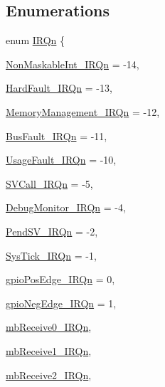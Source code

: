 \subsection*{Enumerations}
\begin{DoxyCompactItemize}
\item 
enum \hyperlink{a00468_a666eb0caeb12ec0e281415592ae89083}{IRQn} \{ \par
\hyperlink{a00468_a666eb0caeb12ec0e281415592ae89083ade177d9c70c89e084093024b932a4e30}{NonMaskableInt\_\-IRQn} =  -\/14, 
\par
\hyperlink{a00468_a666eb0caeb12ec0e281415592ae89083ab1a222a34a32f0ef5ac65e714efc1f85}{HardFault\_\-IRQn} =  -\/13, 
\par
\hyperlink{a00468_a666eb0caeb12ec0e281415592ae89083a33ff1cf7098de65d61b6354fee6cd5aa}{MemoryManagement\_\-IRQn} =  -\/12, 
\par
\hyperlink{a00468_a666eb0caeb12ec0e281415592ae89083a8693500eff174f16119e96234fee73af}{BusFault\_\-IRQn} =  -\/11, 
\par
\hyperlink{a00468_a666eb0caeb12ec0e281415592ae89083a6895237c9443601ac832efa635dd8bbf}{UsageFault\_\-IRQn} =  -\/10, 
\par
\hyperlink{a00468_a666eb0caeb12ec0e281415592ae89083a4ce820b3cc6cf3a796b41aadc0cf1237}{SVCall\_\-IRQn} =  -\/5, 
\par
\hyperlink{a00468_a666eb0caeb12ec0e281415592ae89083a8e033fcef7aed98a31c60a7de206722c}{DebugMonitor\_\-IRQn} =  -\/4, 
\par
\hyperlink{a00468_a666eb0caeb12ec0e281415592ae89083a03c3cc89984928816d81793fc7bce4a2}{PendSV\_\-IRQn} =  -\/2, 
\par
\hyperlink{a00468_a666eb0caeb12ec0e281415592ae89083a6dbff8f8543325f3474cbae2446776e7}{SysTick\_\-IRQn} =  -\/1, 
\par
\hyperlink{a00468_a666eb0caeb12ec0e281415592ae89083ab98b2a9cd2f0a724c5eb4016c6a1309e}{gpioPosEdge\_\-IRQn} =  0, 
\par
\hyperlink{a00468_a666eb0caeb12ec0e281415592ae89083a2ef7c32e51de2e59f9a40a292137d631}{gpioNegEdge\_\-IRQn} =  1, 
\par
\hyperlink{a00468_a666eb0caeb12ec0e281415592ae89083a29d7033f9451e20fec8528e55a63a491}{mbReceive0\_\-IRQn}, 
\par
\hyperlink{a00468_a666eb0caeb12ec0e281415592ae89083a20423ac756a76f4b0a0250f9a0855652}{mbReceive1\_\-IRQn}, 
\par
\hyperlink{a00468_a666eb0caeb12ec0e281415592ae89083a8a4ee8c5b6be68b2e8b5e40f0b1d92ce}{mbReceive2\_\-IRQn}, 
\par

\end{DoxyCompactItemize}
